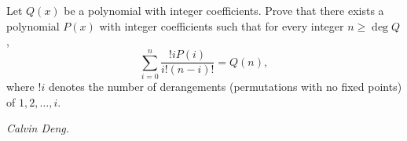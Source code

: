Let $Q(x)$ be a polynomial with integer coefficients. Prove that there exists a polynomial $P(x)$ with integer coefficients such that for every integer $n\ge\deg{Q}$,
\[\sum_{i=0}^{n}\frac{!i P(i)}{i!(n-i)!} = Q(n),\]where $!i$ denotes the number of derangements (permutations with no fixed points) of $1,2,\ldots,i$.

\textit{Calvin Deng.}